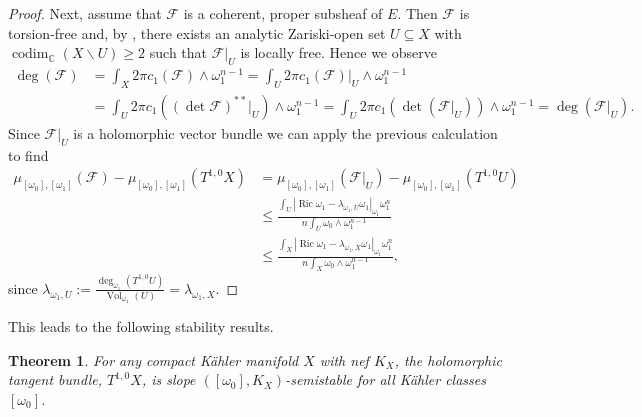 \documentclass[12pt]{article}
\newtheorem{theorem}{Theorem}[section]
\numberwithin{equation}{section}
\newcommand{\C}{\mathbb{C}}
\DeclareMathOperator{\Ric}{Ric}
\DeclareMathOperator{\Vol}{Vol}
\DeclareMathOperator{\codim}{codim}
\begin{document}
\begin{proof}
\noindent Next, assume that $\mathcal{F}$ is a coherent, proper subsheaf of $E$. Then $\mathcal{F}$ is torsion-free and, by \cite[Cor. 5.5.15.]{K14}, there exists an analytic Zariski-open set $U \subseteq X$ with $\codim_{\C}(X\backslash U) \geq 2$ such that $\mathcal{F}|_U$ is locally free. Hence we observe
\begin{align*}
    \deg(\mathcal{F}) &= \int_X 2 \pi c_1(\mathcal{F}) \wedge \omega_1^{n-1} = \int_U 2 \pi c_1(\mathcal{F})|_U \wedge \omega_1^{n-1}\\ 
    &= \int_U 2 \pi c_1((\det \mathcal{F})^{**}|_U) \wedge \omega_1^{n-1} = \int_U 2 \pi c_1(\det(\mathcal{F}|_U)) \wedge \omega_1^{n-1} = \deg(\mathcal{F}|_U).
\end{align*}
Since $\mathcal{F}|_U$ is a holomorphic vector bundle we can apply the previous calculation to find
\begin{align*}
    \mu_{[\omega_0],[\omega_1]}(\mathcal{F}) - \mu_{[\omega_0],[\omega_1]}(T^{1,0} X) &= \mu_{[\omega_0],[\omega_1]}(\mathcal{F}|_U) - \mu_{[\omega_0],[\omega_1]}(T^{1,0}U)\\
    &\leq \frac{\int_U |\Ric \omega_1 - \lambda_{\omega_1,U} \omega_1|_{\omega_1} \omega_1^n}{n\int_U \omega_0 \wedge \omega_1^{n-1}}\\
    &\leq \frac{\int_X |\Ric \omega_1 - \lambda_{\omega_1,X} \omega_1|_{\omega_1} \omega_1^n }{n \int_X \omega_0 \wedge \omega_1^{n-1}},
\end{align*}
since $\lambda_{\omega_1,U} := \frac{\deg_{\omega_1}(T^{1,0}U)}{\Vol_{\omega_1}(U)} = \lambda_{\omega_1,X}$.
\end{proof}

\noindent This leads to the following stability results.

\begin{theorem}
For any compact K\"ahler manifold $X$ with nef $K_X$, the holomorphic tangent bundle, $T^{1,0} X$, is slope $([\omega_0], K_X)$-semistable for all K\"ahler classes $[\omega_0]$.
\end{theorem}
\end{document}
